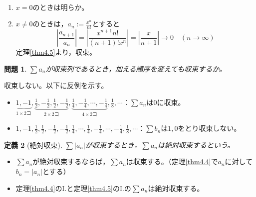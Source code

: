 \documentclass[dvipdfmx,a4j,10pt]{jsarticle}
\makeatletter
\theoremstyle{mystyle1}
\newtheorem{dfn}{定義}[part]
\newtheorem{qes}[dfn]{問題}
\theoremstyle{mystyle2}
\newtheorem{ans}{解答}
\renewenvironment{ans}[1][解答]{\par
  \pushQED{\qed}%
  \normalfont
  \topsep6\p@\@plus6\p@ \trivlist
  \item[\hskip\labelsep{\bfseries\sffamily #1}]\ignorespaces
}{%
  \popQED\endtrivlist\@endpefalse
}
\makeatother
\begin{document}
\begin{ans}[例題\ref{ex4.1}の解答（前半）]\
\begin{enumerate}
\renewcommand{\labelenumi}{Case\arabic{enumi}.}
\item $x=0$のときは明らか。
\item $x\neq 0$のときは，$\displaystyle a_n:=\frac{x^n}{n!}$とすると
	\[\left|\frac{a_{n+1}}{a_n}\right|=\left|\frac{x^{n+1}n!}{(n+1)!x^n}\right|=\left|\frac{x}{n+1}\right|\to0\quad(n\to\infty)\]
	定理\ref{thm4.5}より，収束。
\end{enumerate}
\end{ans}

\newpage

\begin{shaded}
\begin{qes}\label{q4.6}
	$\displaystyle\sum a_n$が収束列であるとき，加える順序を変えても収束するか。
\end{qes}
\end{shaded}

\begin{ans}[解答\ref{q4.6}]
    収束しない。以下に反例を示す。
    \begin{itemize}
    \item $\displaystyle \underbrace{1,-1}_{1\times 2コ},\underbrace{\frac{1}{2},-\frac{1}{2},\frac{1}{2},-\frac{1}{2}}_{2\times 2コ},\underbrace{\frac{1}{4},-\frac{1}{4},\cdots,-\frac{1}{4}}_{4\times 2コ},\frac{1}{8},\cdots$：$\displaystyle\sum a_n$は$0$に収束。
    \item $\displaystyle 1,-1,\frac{1}{2},\frac{1}{2},-\frac{1}{2},-\frac{1}{2},\frac{1}{4},\cdots,\frac{1}{4},-\frac{1}{4},\cdots,-\frac{1}{4},\frac{1}{8},\cdots$：$\displaystyle\sum b_n$は$1,0$をとり収束しない。
    \end{itemize}
\end{ans}

\begin{framed}
    \begin{dfn}[絶対収束]
        $\displaystyle\sum |a_n|$が収束するとき，$\displaystyle\sum a_n$は絶対収束するという。
    \end{dfn}
\end{framed}

\begin{itemize}
    \item $\displaystyle\sum a_n$が絶対収束するならば，$\displaystyle\sum a_n$は収束する。（定理\ref{thm4.4}で$a_n$に対して$b_n=|a_n|$とする）
    \item 定理\ref{thm4.4}のI.と定理\ref{thm4.5}のI.の$\displaystyle\sum a_n$は絶対収束する。
\end{itemize}
\end{document}
